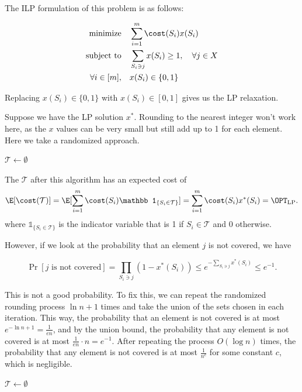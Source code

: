 The ILP formulation of this problem is as follows:

\begin{align*}
	\text{minimize} \quad    & \sum_{i=1}^m \cost(S_i) x(S_i)                        \\
	\text{subject to} \quad  & \sum_{S_i \ni j} x(S_i) \geq 1, \quad \forall j \in X \\
	\forall i \in [m], \quad & x(S_i) \in \{0, 1\}
\end{align*}

Replacing $x(S_i) \in \{0, 1\}$ with $x(S_i) \in [0, 1]$ gives us the LP relaxation.

Suppose we have the LP solution $x^*$. Rounding to the nearest integer won't work here, as the $x$ values can be very small but still add up to 1 for each element. Here we take a randomized approach.

\begin{algorithm}[H]
	\caption{One-Time Randomized Rounding for Weighted Set Cover}
	$\mathcal T \gets \emptyset$\;
\end{algorithm}

The $\mathcal T$ after this algorithm has an expected cost of
\[ \E[\cost(\mathcal T)] = \E[\sum_{i=1}^{m} \cost(S_i)\mathbb 1_{\{S_i\in \mathcal T\}}] = \sum_{i=1}^m \cost(S_i) x^*(S_i) = \OPT_\text{LP}. \]
where $\mathbb 1_{\{S_i\in \mathcal T\}}$ is the indicator variable that is 1 if $S_i \in \mathcal T$ and 0 otherwise.

However, if we look at the probability that an element $j$ is not covered, we have

\[ \Pr[j \text{ is not covered}] = \prod_{S_i \ni j} (1 - x^*(S_i)) \leq e^{-\sum_{S_i \ni j} x^*(S_i)} \leq e^{-1}. \]

This is not a good probability. To fix this, we can repeat the randomized rounding process $\ln n + 1$ times and take the union of the sets chosen in each iteration. This way, the probability that an element is not covered is at most $e^{-\ln n+1} = \frac{1}{en}$, and by the union bound, the probability that any element is not covered is at most $\frac{1}{en} \cdot n = e^{-1}$. After repeating the process $O(\log n)$ times, the probability that any element is not covered is at most $\frac{1}{n^c}$ for some constant $c$, which is negligible.

\begin{algorithm}[H]
	\caption{Approximated Weighted Set Cover}
	$\mathcal T \gets \emptyset$\;
\end{algorithm}

